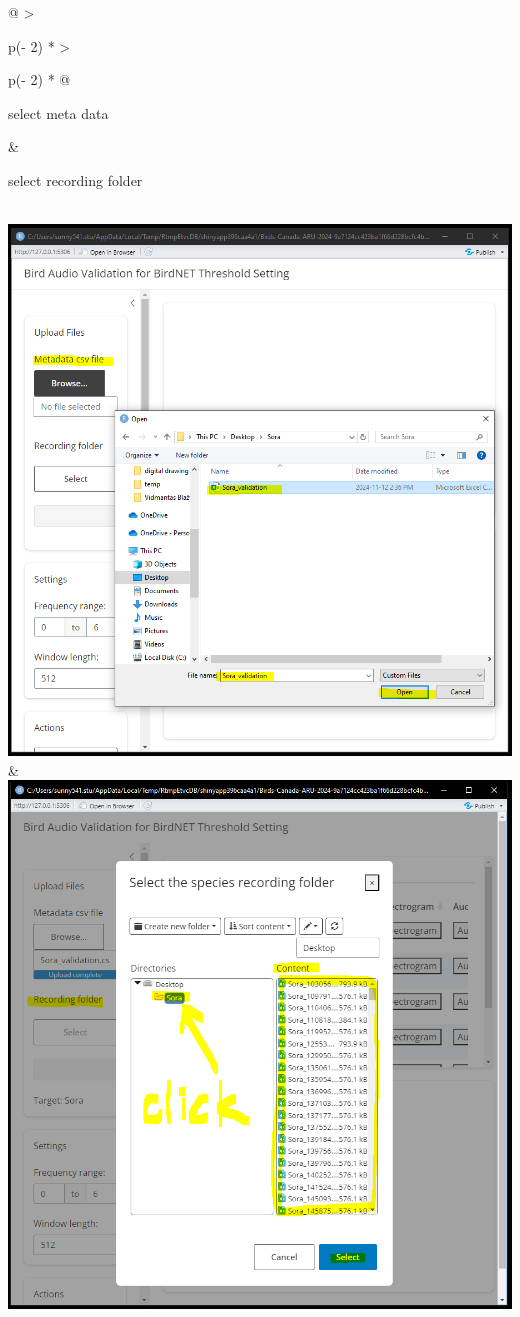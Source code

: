 \documentclass[
]{article}
\begin{document}
\begin{longtable}[]{@{}
  >{\raggedright\arraybackslash}p{(\columnwidth - 2\tabcolsep) * }
  >{\raggedright\arraybackslash}p{(\columnwidth - 2\tabcolsep) * }@{}}
\toprule\noalign{}
\begin{minipage}[b]{\linewidth}\raggedright
select meta data
\end{minipage} & \begin{minipage}[b]{\linewidth}\raggedright
select recording folder
\end{minipage} \\
\midrule\noalign{}
\endhead
\bottomrule\noalign{}
\endlastfoot
\includegraphics{images/clipboard-3018843216.png} &
\includegraphics{images/clipboard-1068388884.png} \\

\end{longtable}
\end{document}
